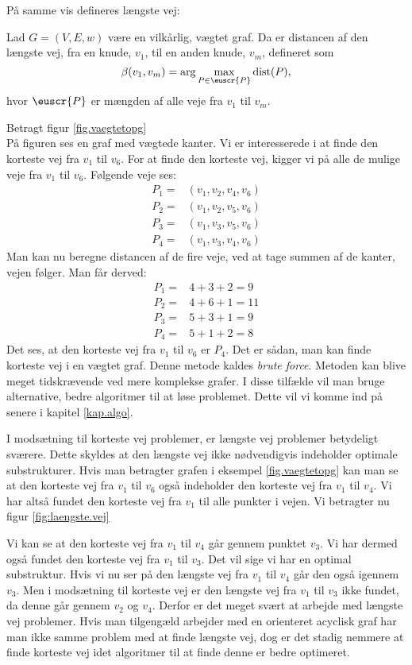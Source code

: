 På samme vis defineres længste vej:

\begin{defn} 
	Lad $G=(V,E,w)$ være en vilkårlig, vægtet graf. Da er distancen af den længste vej, fra en knude, $v_1$, til en anden knude, $v_m$, defineret som
	\begin{equation*}
		\beta(v_1,v_m)=\arg \max_{P \in \euscr{P}}
		\textrm{dist}(P),
	\end{equation*}
	hvor $\euscr{P}$ er mængden af alle veje fra $v_1$ til $v_m$.
\end{defn}

\begin{exmp}
Betragt figur \ref{fig.vaegtetopg} \\

På figuren ses en graf med vægtede kanter. Vi er interesserede i at finde den korteste vej fra $v_1$ til $v_6$. For at finde den korteste vej, kigger vi på alle de mulige veje fra $v_1$ til $v_6$.
Følgende veje ses:
\begin{align*}
	P_1=&(v_1,v_2,v_4,v_6)\\
	P_2=&(v_1,v_2,v_5,v_6)\\
	P_3=&(v_1,v_3,v_5,v_6)\\
	P_4=&(v_1,v_3,v_4,v_6)
\end{align*}
Man kan nu beregne distancen af de fire veje, ved at tage summen af de kanter, vejen følger. Man får derved:
\begin{align*}
	P_1=&4+3+2=9\\
	P_2=&4+6+1=11\\
	P_3=&5+3+1=9\\
	P_4=&5+1+2=8
\end{align*}
Det ses, at den korteste vej fra $v_1$ til $v_6$ er $P_4$. 
Det er sådan, man kan finde korteste vej i en vægtet graf. Denne metode kaldes \emph{brute force}. Metoden kan blive meget tidskrævende ved mere komplekse grafer. I disse tilfælde vil man bruge alternative, bedre algoritmer til at løse problemet. Dette vil vi komme ind på senere i kapitel \ref{kap.algo}.
\end{exmp}

I modsætning til korteste vej problemer, er længste vej problemer betydeligt sværere. Dette skyldes at den længste vej ikke nødvendigvis indeholder optimale substrukturer. Hvis man betragter grafen i eksempel \ref{fig.vaegtetopg} kan man se at den korteste vej fra $v_1$ til $v_6$ også indeholder den korteste vej fra $v_1$ til $v_4$. Vi har altså fundet den korteste vej fra $v_1$ til alle punkter i vejen.
Vi betragter nu figur \ref{fig:laengste.vej}

Vi kan se at den korteste vej fra $v_1$ til $v_4$ går gennem punktet $v_3$. Vi har dermed også fundet den korteste vej fra $v_1$ til $v_3$. Det vil sige vi har en optimal substruktur. Hvis vi nu ser på den længste vej fra $v_1$ til $v_4$ går den også igennem $v_3$. Men i modsætning til korteste vej er den længste vej fra $v_1$ til $v_3$ ikke fundet, da denne går gennem $v_2$ og $v_4$. Derfor er det meget svært at arbejde med længste vej problemer.
Hvis man tilgengæld arbejder med en orienteret acyclisk graf har man ikke samme problem med at finde længste vej, dog er det stadig nemmere at finde korteste vej idet algoritmer til at finde denne er bedre optimeret.
